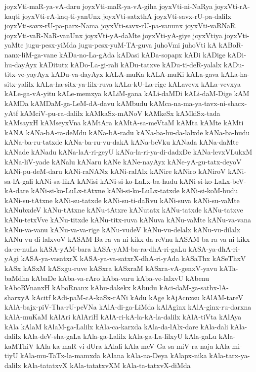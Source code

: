 {joyxVti-maR-ya-vA-daru
joyxVti-maR-ya-vA-giha
joyxVti-ni-NaRya
joyxVti-rA-kaqti
joyxVti-rA-kaq-ti-yanUnx
joyxVti-satxthA
joyxVti-savx-rU-pa-dalilx
joyxVti-savx-rU-pa-parx-Nama
joyxVti-savx-rU-pa-vanunx
joyxVti-vaRNaR
joyxVti-vaR-NaR-vanUnx
joyxVti-yA-daMte
joyxVti-yA-giye
joyxVtiya
joyxVti-yaMte
jugu-pesx-yiMda
jugu-pesx-yuM-TA-guva
juhoVmi
juhoVti
kA
kABoR-nanx-liM-ga-vane
kADa-no-La-gAda
kADasi
kADa-sopapx
kADi
kADige
kADi-hu-dayAyx
kADitutx
kADo-La-gi-rali
kADu-tatxve
kADu-ti-deR-yalalx
kADu-titx-ve-yayAyx
kADu-va-dayAyx
kALA-muKa
kALA-muKi
kALa-gava
kALa-ha-sitx-yalilx
kALa-ha-sitx-ya-lilx-ruva
kALa-kU-La-rige
kALavevx
kALa-vevxya
kALe-ga-vA-yitu
kALe-memxya
kALiM-gana
kALi-daMDi
kALi-daM-Dige
kAM
kAMDa
kAMDaM-ga-LeM-dA-davu
kAMbudu
kAMca-na-ma-ya-tavx-ni-shacx-yAtf
kAMciV-pu-ra-dalilx
kAMkaSx-mANoV
kAMkeSx
kAMkiSx-tada
kAMsayxH
kAMseyxVna
kAMtAra
kAMtA-sa-meVtaM
kAMta
kAMte
kAMti
kANA
kANa-bA-ra-deMdu
kANa-bA-radu
kANa-ba-hu-da-lalxde
kANa-ba-hudu
kANa-ba-ru-tatxde
kANa-ba-ru-vu-dakA
kANa-beVku
kANada
kANa-daMte
kANade
kANadu
kANa-laA-ri-geyU
kANa-la-ri-ya-di-dadxDe
kANa-levxVLukxM
kANa-liV-yade
kANalu
kANaru
kANe
kANe-nayAyx
kANe-yA-gu-tatx-deyoV
kANi-pu-deM-daru
kANi-raNANx
kANi-ralAlx
kANire
kANiro
kANiroV
kANi-sa-lA-gali
kANi-sa-likA
kANisi
kANi-si-ko-LaLx-ba-hudu
kANi-si-ko-LaLx-beV-kA-dare
kANi-si-ko-LuLx-tAtxne
kANi-si-ko-LuLx-tatxde
kANi-si-koM-budu
kANi-su-tAtxne
kANi-su-tatxde
kANi-su-ti-daRvu
kANi-suva
kANi-su-vaMte
kANubxdeV
kANu-tAtxne
kANu-tAtxre
kANutatx
kANu-tatxde
kANu-tatxve
kANu-tetxVve
kANu-titxde
kANu-titx-ruva
kANuva
kANu-vaMte
kANu-va-vana
kANu-va-vanu
kANu-va-va-rige
kANu-vudeV
kANu-vu-delalx
kANu-vu-dilalx
kANu-vu-di-lalxvoV
kASAM-Ba-ra-va-ni-kikx-da-reVnu
kASAM-ba-ra-va-ni-kikx-da-re-nuLa
kASA-yAM-bara
kASA-yAM-ba-ra-dhA-ri-gaLu
kASA-ya-dhA-ri-yAgi
kASA-ya-vasatxrX
kASA-ya-va-satxrX-dhA-ri-yAda
kASaThx
kASeThxV
kASx
kASxM
kASxgu-ruve
kASxra
kASxraM
kASxra-vA-genxV-yavu
kATa-baMdha
kAbaDe
kAba-va-rAro
kAba-varu
kAba-ve-lalxvU
kAbenu
kAboRVnanxH
kAboRnanx
kAbu-dakekx
kAbudu
kAci-daM-ga-sathx-lA-sharxyA
kAcitf
kAdi-paM-cA-kaSx-rANi
kAdu
kAge
kAjAcnxsu
kAlAM-tareV
kAlA-bajx-piV-Tha-rU-peVNa
kAlA-di-ga-LiMda
kAlAginx
kAlA-ginx-ru-darxna
kAlA-muKaM
kAlAri
kAlAriH
kAlA-ri-kA-la-kA-la-dalilx
kAlA-tiVta
kAlAya
kAla
kAlaM
kAlaM-ga-Lalilx
kAla-ca-karxda
kAla-da-lAlx-dare
kAla-dali
kAla-dalilx
kAla-deV-sha-gaLa
kAla-ga-Lalilx
kAla-ga-La-lilxyU
kAla-gaLu
kAla-kaMThiV
kAla-ka-maR-vi-dUra
kAlali
kAla-meV-Ga-sa-miV-ra-naja
kAla-mi-tiyU
kAla-mu-TaTx-la-mamxda
kAlana
kAla-na-Deya
kAlapx-nika
kAla-tarx-ya-dalilx
kAla-tatatxvX
kAla-tatatxvXM
kAla-ta-tatxvX-diMda
}
